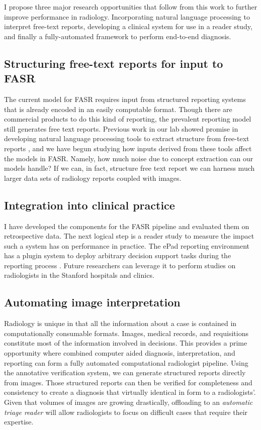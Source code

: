 I propose three major research opportunities that follow from this work to further improve performance in radiology. Incorporating natural language processing to interpret free-text reports, developing a clinical system for use in a reader study, and finally a fully-automated framework to perform end-to-end diagnosis.

\subsection{Structuring free-text reports for input to FASR}
The current model for FASR requires input from structured reporting systems that is already encoded in an easily computable format. Though there are commercial products to do this kind of reporting, the prevalent reporting model still generates free text reports. Previous work in our lab showed promise in developing natural language processing tools to extract structure from free-text reports \cite{Bozkurt:2014jw}, and we have begun studying how inputs derived from these tools affect the models in FASR. Namely, how much noise due to concept extraction can our models handle? If we can, in fact, structure free text report we can harness much larger data sets of radiology reports coupled with images.

\subsection{Integration into clinical practice}
I have developed the components for the FASR pipeline and evaluated them on retrospective data. The next logical step is a reader study to measure the impact such a system has on performance in practice. The ePad reporting environment has a plugin system to deploy arbitrary decision support tasks during the reporting process \cite{Rubin:2008uz}. Future researchers can leverage it to perform studies on radiologists in the Stanford hospitals and clinics.

\subsection{Automating image interpretation}
Radiology is unique in that all the information about a case is contained in computationally consumable formats. Images, medical records, and requisitions constitute most of the information involved in decisions. This provides a prime opportunity where combined computer aided diagnosis, interpretation, and reporting can form a fully automated computational radiologist pipeline. Using the annotative verification system, we can generate structured reports directly from images. Those structured reports can then be verified for completeness and consistency to create a diagnosis that virtually identical in form to a radiologists'. Given that volumes of images are growing drastically, offloading to an \emph{automatic triage reader} will allow radiologists to focus on difficult cases that require their expertise.
